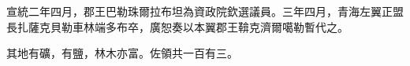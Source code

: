 \begin{pinyinscope}
宣統二年四月，郡王巴勒珠爾拉布坦為資政院欽選議員。三年四月，青海左翼正盟長扎薩克貝勒車林端多布卒，廣恕奏以本翼郡王鞥克濟爾噶勒暫代之。

其地有礦，有鹽，林木亦富。佐領共一百有三。


\end{pinyinscope}